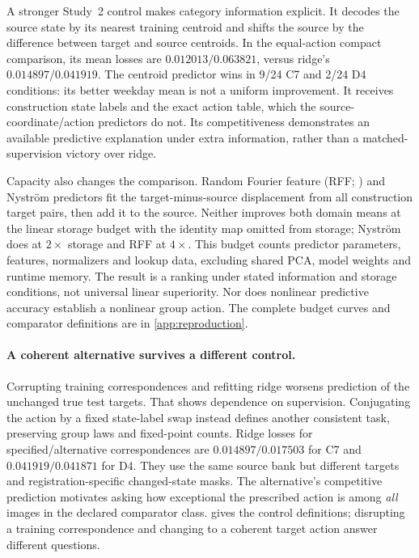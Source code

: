A stronger Study~2 control makes category information explicit. It decodes the source state by its nearest training centroid and shifts the source by the difference between target and source centroids. In the equal-action compact comparison, its mean losses are $0.012013/0.063821$, versus ridge's $0.014897/0.041919$. The centroid predictor wins in 9/24 C7 and 2/24 D4 conditions: its better weekday mean is not a uniform improvement. It receives construction state labels and the exact action table, which the source-coordinate/action predictors do not. Its competitiveness demonstrates an available predictive explanation under extra information, rather than a matched-supervision victory over ridge.

Capacity also changes the comparison. Random Fourier feature (RFF; \citealp{rahimi2007random}) and Nystr\"om \citep{williams2000nystrom} predictors fit the target-minus-source displacement from all construction target pairs, then add it to the source. Neither improves both domain means at the linear storage budget with the identity map omitted from storage; Nystr\"om does at $2\times$ storage and RFF at $4\times$. This budget counts predictor parameters, features, normalizers and lookup data, excluding shared PCA, model weights and runtime memory. The result is a ranking under stated information and storage conditions, not universal linear superiority. Nor does nonlinear predictive accuracy establish a nonlinear group action. The complete budget curves and comparator definitions are in \cref{app:reproduction}.

\paragraph{A coherent alternative survives a different control.}
Corrupting training correspondences and refitting ridge worsens prediction of the unchanged true test targets. That shows dependence on supervision. Conjugating the action by a fixed state-label swap instead defines another consistent task, preserving group laws and fixed-point counts. Ridge losses for specified/alternative correspondences are $0.014897/0.017503$ for C7 and $0.041919/0.041871$ for D4. They use the same source bank but different targets and registration-specific changed-state masks. The alternative's competitive prediction motivates asking how exceptional the prescribed action is among \emph{all} images in the declared comparator class.  gives the control definitions; disrupting a training correspondence and changing to a coherent target action answer different questions.

